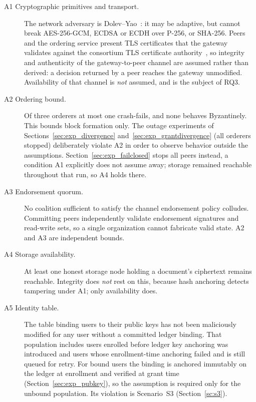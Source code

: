 \documentclass[preprint,12pt]{elsarticle}
\begin{document}
\begin{description}
\item[A1 Cryptographic primitives and transport.] The network adversary is
Dolev--Yao~\cite{dolev1983security}: it may be adaptive, but cannot
break AES-256-GCM, ECDSA or ECDH over P-256, or SHA-256. Peers and the ordering
service present TLS certificates that the gateway validates against the
consortium TLS certificate authority~\cite{rescorla2018tls}, so integrity and
authenticity of the gateway-to-peer channel are assumed rather than derived: a
decision returned by a peer reaches the gateway unmodified. Availability of that
channel is \emph{not} assumed, and is the subject of RQ3.

\item[A2 Ordering bound.] Of three orderers at most one crash-fails, and
none behaves Byzantinely. This bounds block formation only. The outage
experiments of Sections~\ref{sec:exp_divergence}
and~\ref{sec:exp_grantdivergence} (all orderers stopped) deliberately violate
A2 in order to observe behavior outside the assumptions.
Section~\ref{sec:exp_failclosed} stops all peers instead, a condition A1
explicitly does not assume away; storage remained reachable throughout that
run, so A4 holds there.

\item[A3 Endorsement quorum.] No coalition sufficient to satisfy the channel
endorsement policy colludes. Committing peers independently validate
endorsement signatures and read-write sets, so a single organization cannot
fabricate valid state. A2 and A3 are independent bounds.

\item[A4 Storage availability.] At least one honest storage node holding a
document's ciphertext remains reachable. Integrity does \emph{not} rest on
this, because hash anchoring detects tampering under A1; only availability
does.

\item[A5 Identity table.] The table binding users to their public keys has
not been maliciously modified for any user without a committed ledger binding.
That population includes users enrolled before ledger key anchoring was
introduced and users whose enrollment-time anchoring failed and is still
queued for retry. For bound users the binding is anchored immutably on the
ledger at enrollment and verified at grant time
(Section~\ref{sec:exp_pubkey}), so the assumption is required only for the
unbound population. Its violation is Scenario~S3 (Section~\ref{sc:s3}).


\end{description}
\end{document}
